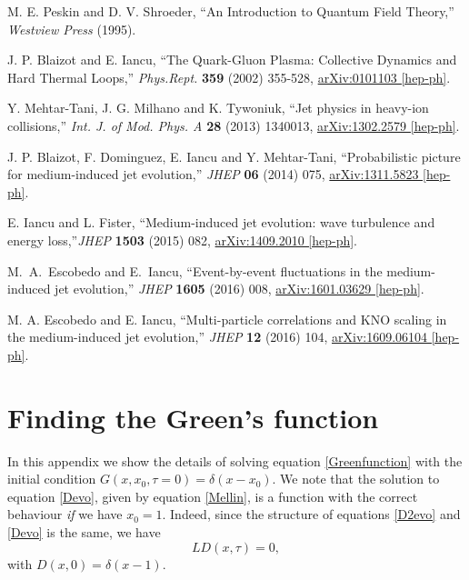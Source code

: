 \documentclass[a4paper,12pt]{article}
\numberwithin{equation}{section}
\begin{document}
\begin{thebibliography}{10}
M. E. Peskin and D. V. Shroeder, ``An Introduction to Quantum Field Theory,'' \emph{Westview Press} (1995).

 	
J. P. Blaizot and E. Iancu, ``The Quark-Gluon Plasma: Collective Dynamics and Hard Thermal Loops,''
{\em Phys.Rept.} {\bf 359} (2002) 355-528,
\href{https://arxiv.org/abs/hep-ph/0101103}{{\ttfamily arXiv:0101103 [hep-ph]}}.
  
 	
Y. Mehtar-Tani, J. G. Milhano and K. Tywoniuk, ``Jet physics in heavy-ion collisions,''
{\em Int. J. of Mod. Phys. A} {\bf 28} (2013) 1340013,
\href{https://arxiv.org/abs/1302.2579}{{\ttfamily arXiv:1302.2579 [hep-ph]}}.
  
  



J. P. Blaizot, F. Dominguez, E. Iancu and Y. Mehtar-Tani, ``Probabilistic picture for medium-induced jet evolution,'' {\em JHEP} {\bf 06} (2014) 075,
 \href{http://arxiv.org/abs/1311.5823}{{\ttfamily arXiv:1311.5823 [hep-ph]}}.
 	


 E. Iancu and L. Fister, ``Medium-induced jet evolution: wave turbulence and energy loss,''{\em JHEP} {\bf 1503} (2015) 082,
 \href{http://arxiv.org/abs/1409.2010}{{\ttfamily arXiv:1409.2010 [hep-ph]}}.






  M.~A.~Escobedo and E.~Iancu,
  ``Event-by-event fluctuations in the medium-induced jet evolution,''
  {\em JHEP} {\bf 1605}  (2016) 008,
  \href{http://arxiv.org/abs/1601.03629}{{\ttfamily  arXiv:1601.03629 [hep-ph]}}.
  



M. A. Escobedo and E. Iancu, ``Multi-particle correlations and KNO scaling in the medium-induced jet evolution,''
{\em JHEP} {\bf 12} (2016) 104,
\href{https://arxiv.org/abs/1609.06104}{{\ttfamily arXiv:1609.06104 [hep-ph]}}.
 	
\end{thebibliography}
\newpage
\appendix




\section{Finding the Green's function}\label{Greendetails}
In this appendix we show the details of solving equation \eqref{Greenfunction} with the initial condition $G(x,x_0,\tau=0)=\delta(x-x_0)$. We note that the solution to equation \eqref{Devo}, given by equation \eqref{Mellin}, is a function with the correct behaviour \emph{if} we have $x_0=1$. Indeed, since the structure of equations \eqref{D2evo} and \eqref{Devo} is the same, we have
\begin{equation}
L D(x,\tau)=0,
\end{equation}
with $D(x,0)=\delta(x-1)$.
\end{document}
